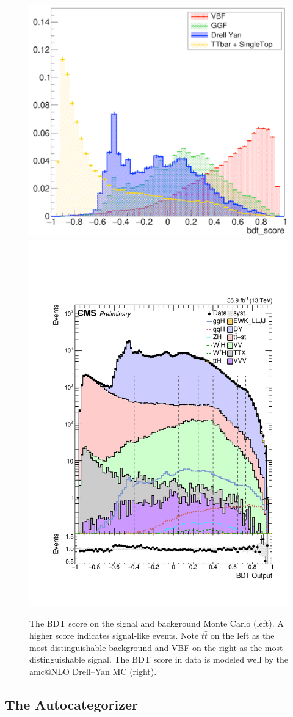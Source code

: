 \begin{figure}[h!]
  \centering
  \includegraphics[width=0.49\linewidth]{images/bdt_cats/bdt_score_ggH_VBF_DY_ttbar.pdf}
  \includegraphics[width=0.49\linewidth]{images/bdt_cats/BdtOnH_bkg.pdf}
  \caption[BDT score distributions for signal MC, background MC, and data.]
   {The BDT score on the signal and background Monte Carlo (left). A higher score indicates signal-like events.
    Note $t\bar{t}$ on the left as the most distinguishable background and VBF on the right as the most distinguishable signal.
    The BDT score in data is modeled well by the amc@NLO Drell--Yan MC (right).}
  \label{fig:bdt_score_inclusive}
\end{figure}

\FloatBarrier
\subsection{The Autocategorizer}

